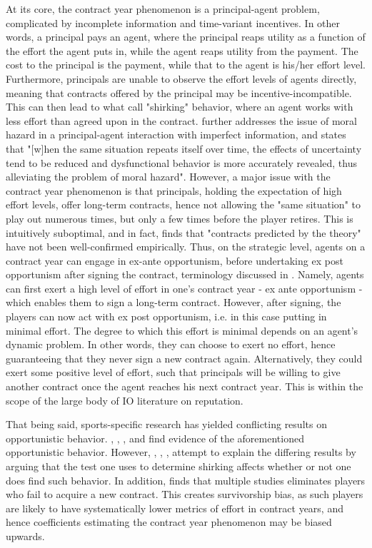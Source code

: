 \documentclass[12pt]{article}
\begin{document}
	At its core, the contract year phenomenon is a principal-agent problem, complicated by incomplete information and time-variant incentives. In other words, a principal pays an agent, where the principal reaps utility as a function of the effort the agent puts in, while the agent reaps utility from the payment. The cost to the principal is the payment, while that to the agent is his/her effort level. Furthermore, principals are unable to observe the effort levels of agents directly, meaning that contracts offered by the principal may be incentive-incompatible. This can then lead to what \cite{alchian_1972} call "shirking" behavior, where an agent works with less effort than agreed upon in the contract. \cite{holmstrom_contracts_1999} further addresses the issue of moral hazard in a principal-agent interaction with imperfect information, and states that "[w]hen the same situation repeats itself over time, the effects of uncertainty tend to be reduced and dysfunctional behavior is more accurately revealed, thus alleviating the problem of moral hazard". However, a major issue with the contract year phenomenon is that principals, holding the expectation of high effort levels, offer long-term contracts, hence not allowing the "same situation" to play out numerous times, but only a few times before the player retires. This is intuitively suboptimal, and in fact, \cite{prendergast_1999} finds that "contracts predicted by the theory" have not been well-confirmed empirically. Thus, on the strategic level, agents on a contract year can engage in ex-ante opportunism, before undertaking ex post opportunism after signing the contract, terminology discussed in \cite{ress_1994}. Namely, agents can first exert a high level of effort in one's contract year - ex ante opportunism - which enables them to sign a long-term contract. However, after signing, the players can now act with ex post opportunism, i.e. in this case putting in minimal effort. The degree to which this effort is minimal depends on an agent's dynamic problem. In other words, they can choose to exert no effort, hence guaranteeing that they never sign a new contract again. Alternatively, they could exert some positive level of effort, such that principals will be willing to give another contract once the agent reaches his next contract year. This is within the scope of the large body of IO literature on reputation.
	
	That being said, sports-specific research has yielded conflicting results on opportunistic behavior. \cite{lehn_1982}, \cite{scoggins_1993}, \cite{stiroh_2006}, and \cite{paulsen_2018} find evidence of the aforementioned opportunistic behavior. However, \cite{krautmann_1990}, \cite{maxcy_2002}, \cite{berri_2007}, \cite{krautmann_2009} attempt to explain the differing results by arguing that the test one uses to determine shirking affects whether or not one does find such behavior. In addition, \cite{ryan_show_2015} finds that multiple studies eliminates players who fail to acquire a new contract. This creates survivorship bias, as such players are likely to have systematically lower metrics of effort in contract years, and hence coefficients estimating the contract year phenomenon may be biased upwards.
	
\end{document}
